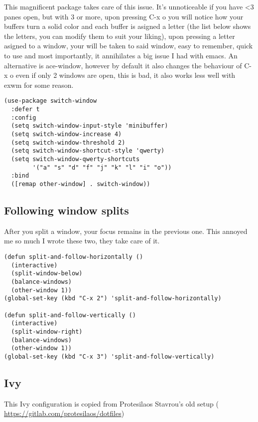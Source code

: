 \documentclass[12pt]{article}
\begin{document}
This magnificent package takes care of this issue. It’s unnoticeable if you have <3 panes open, but with 3 or more, upon pressing C-x o you will notice how your buffers turn a solid color and each buffer is asigned a letter (the list below shows the letters, you can modify them to suit your liking), upon pressing a letter asigned to a window, your will be taken to said window, easy to remember, quick to use and most importantly, it annihilates a big issue I had with emacs. An alternative is ace-window, however by default it also changes the behaviour of C-x o even if only 2 windows are open, this is bad, it also works less well with exwm for some reason.
\begin{verbatim}
(use-package switch-window
  :defer t
  :config
  (setq switch-window-input-style 'minibuffer)
  (setq switch-window-increase 4)
  (setq switch-window-threshold 2)
  (setq switch-window-shortcut-style 'qwerty)
  (setq switch-window-qwerty-shortcuts
        '("a" "s" "d" "f" "j" "k" "l" "i" "o"))
  :bind
  ([remap other-window] . switch-window))
\end{verbatim}

\subsection{Following window splits}
\label{sec:org79ab75f}

After you split a window, your focus remains in the previous one. This annoyed me so much I wrote these two, they take care of it.
\begin{verbatim}
(defun split-and-follow-horizontally ()
  (interactive)
  (split-window-below)
  (balance-windows)
  (other-window 1))
(global-set-key (kbd "C-x 2") 'split-and-follow-horizontally)

(defun split-and-follow-vertically ()
  (interactive)
  (split-window-right)
  (balance-windows)
  (other-window 1))
(global-set-key (kbd "C-x 3") 'split-and-follow-vertically)

\end{verbatim}


\subsection{Ivy}
\label{sec:orgbb2068e}

This Ivy configuration is copied from Protesilaos Stavrou's old setup ( \url{https://gitlab.com/protesilaos/dotfiles})
\end{document}
